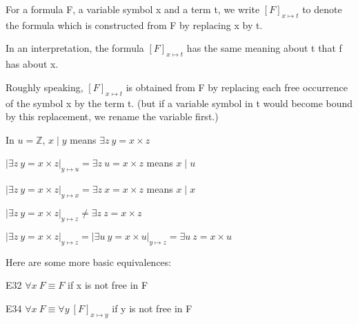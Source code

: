 \begin{nota}
For a formula F, a variable symbol x and a term t, we write $[F]_{x\mapsto t}$ to denote the formula which is constructed from F by replacing x by t.

In an interpretation, the formula $[F]_{x\mapsto t}$ has the same meaning about t that f has about x.

Roughly speaking, $[F]_{x\mapsto t}$ is obtained from F by replacing each free occurrence of the symbol x by the term t. (but if a variable symbol in t would become bound by this replacement, we rename the variable first.)
\end{nota}

\begin{exmp}

In $u=\mathbb{Z}$, $x\mid y$ means $\exists z \ y = x\times z$

$|\exists z \ y = x\times z|_{y\mapsto u} = \exists z \ u = x\times z$ means $x\mid u$

$|\exists z \ y = x\times z|_{y\mapsto x} = \exists z \ x = x\times z$ means $x\mid x$

$|\exists z \ y = x\times z|_{y\mapsto z} \neq  \exists z \ z = x\times z$

$|\exists z \ y = x\times z|_{y\mapsto z} = |\exists u \ y = x\times u|_{y\mapsto z} = \exists u \ z = x\times u$

\end{exmp}

Here are some more basic equivalences:

E32 $\forall x \ F \equiv F$ if x is not free in F

E34 $\forall x \ F \equiv \forall y \ [F]_{x\mapsto y}$ if y is not free in F


